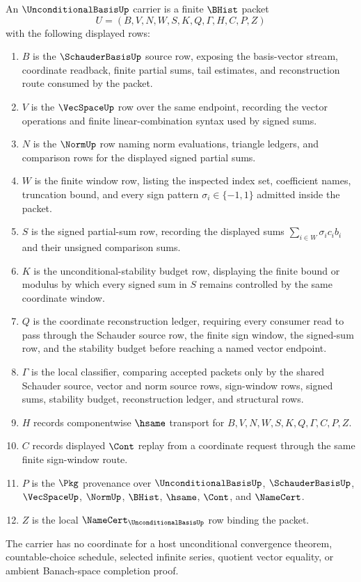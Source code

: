 \begin{definition}
\label{def:unconditional-basis-carrier}
An $\UnconditionalBasisUp$ carrier is a finite $\BHist$ packet
$$
U=(B,V,N,W,S,K,Q,\Gamma,H,C,P,Z)
$$
with the following displayed rows:
\begin{enumerate}
\item $B$ is the $\SchauderBasisUp$ source row, exposing the basis-vector stream, coordinate readback, finite partial sums, tail estimates, and reconstruction route consumed by the packet.
\item $V$ is the $\VecSpaceUp$ row over the same endpoint, recording the vector operations and finite linear-combination syntax used by signed sums.
\item $N$ is the $\NormUp$ row naming norm evaluations, triangle ledgers, and comparison rows for the displayed signed partial sums.
\item $W$ is the finite window row, listing the inspected index set, coefficient names, truncation bound, and every sign pattern $\sigma_i\in\{-1,1\}$ admitted inside the packet.
\item $S$ is the signed partial-sum row, recording the displayed sums $\sum_{i\in W}\sigma_i c_i b_i$ and their unsigned comparison sums.
\item $K$ is the unconditional-stability budget row, displaying the finite bound or modulus by which every signed sum in $S$ remains controlled by the same coordinate window.
\item $Q$ is the coordinate reconstruction ledger, requiring every consumer read to pass through the Schauder source row, the finite sign window, the signed-sum row, and the stability budget before reaching a named vector endpoint.
\item $\Gamma$ is the local classifier, comparing accepted packets only by the shared Schauder source, vector and norm source rows, sign-window rows, signed sums, stability budget, reconstruction ledger, and structural rows.
\item $H$ records componentwise $\hsame$ transport for $B,V,N,W,S,K,Q,\Gamma,C,P,Z$.
\item $C$ records displayed $\Cont$ replay from a coordinate request through the same finite sign-window route.
\item $P$ is the $\Pkg$ provenance over $\UnconditionalBasisUp$, $\SchauderBasisUp$, $\VecSpaceUp$, $\NormUp$, $\BHist$, $\hsame$, $\Cont$, and $\NameCert$.
\item $Z$ is the local $\NameCert_{\UnconditionalBasisUp}$ row binding the packet.
\end{enumerate}
The carrier has no coordinate for a host unconditional convergence theorem, countable-choice schedule, selected infinite series, quotient vector equality, or ambient Banach-space completion proof.
\end{definition}

